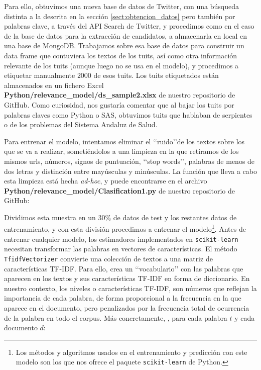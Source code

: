 Para ello, obtuvimos una nueva base de datos de Twitter, con una búsqueda distinta
a la descrita en la sección \ref{sect:obtencion_datos} pero también por palabras clave,
a través del API Search de Twitter, y procedimos como en el caso
de la base de datos para la extracción de candidatos, a almacenarla en local en una base de MongoDB.
Trabajamos sobre esa base de datos para construir un data frame que contuviera los textos de los tuits,
así como otra información relevante de los tuits (aunque luego no se usa en el modelo), y procedimos
a etiquetar manualmente $2000$ de esos tuits. Los tuits etiquetados están almacenados en un fichero
Excel {\bf Python/relevance\_model/ds\_sample2.xlsx} de nuestro repositorio de GitHub.
Como curiosidad, nos gustaría comentar que al bajar los tuits por palabras claves como Python o SAS, 
obtuvimos tuits que hablaban de serpientes o de los problemas del Sistema Andaluz de Salud. 

Para entrenar el modelo, intentamos eliminar el \lq\lq ruido\rq\rq de los textos 
sobre los que se va a realizar, sometiéndolos a una limpieza en la que retiramos
de los mismos urls, números, signos de puntuación, \lq\lq stop words\rq\rq, palabras de menos
de dos letras y distinción entre mayúsculas y minúsculas.
La función que lleva a cabo esta limpieza está hecha {\em ad-hoc}, y puede encontrarse en el
archivo {\bf Python/relevance\_model/Clasification1.py} de nuestro repositorio de GitHub:


Dividimos esta muestra en un $30$\% de datos de test y los restantes datos de entrenamiento,
y con esta división procedimos a entrenar el modelo\footnote{Los métodos y algoritmos usados 
en el entrenamiento y predicción con este modelo son
los que nos ofrece el paquete {\tt  scikit-learn} de Python.}.
Antes de entrenar cualquier modelo, los estimadores implementados en {\tt  scikit-learn}
necesitan transformar las palabras en vectores de características.
El método {\tt TfidfVectorizer} convierte una colección de textos
a una matriz de características TF-IDF. Para ello, crea un  \lq\lq vocabulario\rq\rq 
con las palabras que aparecen en los textos y sus características TF-IDF en forma de diccionario.
En nuestro contexto, los niveles o características TF-IDF, son números que reflejan la 
importancia de cada palabra, de forma proporcional a la frecuencia en la que
aparece en el documento, pero  penalizados por la frecuencia total de ocurrencia 
de la palabra en todo el corpus. Más concretamente, \cite{notas_alvaro}, 
para cada palabra $t$ y cada documento $d$:

